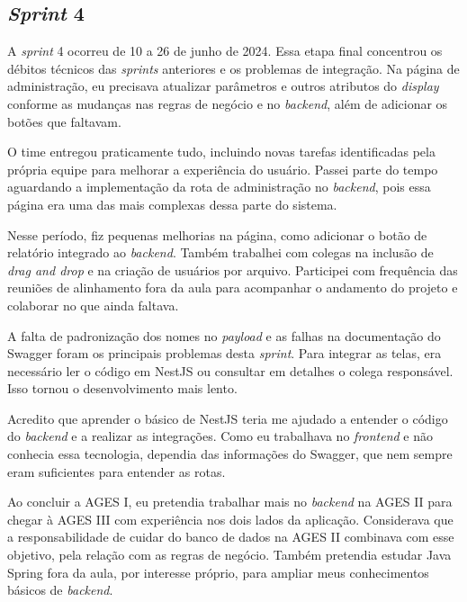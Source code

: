 \subsection{\textit{Sprint} 4}

A \textit{sprint} 4 ocorreu de 10 a 26 de junho de 2024. Essa etapa final
concentrou os débitos técnicos das \textit{sprints}
anteriores e os problemas de integração. Na página de administração, eu precisava
atualizar parâmetros e outros atributos do \textit{display} conforme as mudanças
nas regras de negócio e no \textit{backend}, além de adicionar os botões que
faltavam.

O time entregou praticamente tudo, incluindo novas tarefas identificadas pela
própria equipe para melhorar a experiência do usuário. Passei parte do tempo
aguardando a implementação da rota de administração no \textit{backend}, pois
essa página era uma das mais complexas dessa parte do sistema.

Nesse período, fiz pequenas melhorias na página, como adicionar o botão de
relatório integrado ao \textit{backend}. Também trabalhei com colegas na
inclusão de \textit{drag and drop} e na criação de usuários por arquivo.
Participei com frequência das reuniões de alinhamento fora da aula para acompanhar
o andamento do projeto e colaborar no que ainda faltava.

A falta de padronização dos nomes no \textit{payload} e as falhas na documentação
do Swagger foram os principais problemas desta \textit{sprint}. Para integrar as
telas, era necessário ler o código em NestJS \cite{nestjs-docs} ou consultar em
detalhes o colega responsável. Isso tornou o desenvolvimento mais lento.

Acredito que aprender o básico de NestJS teria me ajudado a entender o código
do \textit{backend} e a realizar as integrações. Como eu trabalhava no
\textit{frontend} e não conhecia essa tecnologia, dependia das informações
do Swagger, que nem sempre eram suficientes para entender as rotas.

Ao concluir a AGES I, eu pretendia trabalhar mais no \textit{backend} na AGES II
para chegar à AGES III com experiência nos dois lados da aplicação. Considerava
que a responsabilidade de cuidar do banco de dados na AGES II combinava com
esse objetivo, pela relação com as regras de negócio. Também pretendia estudar
Java Spring \cite{spring-docs} fora da aula, por interesse próprio, para ampliar
meus conhecimentos básicos de \textit{backend}.
